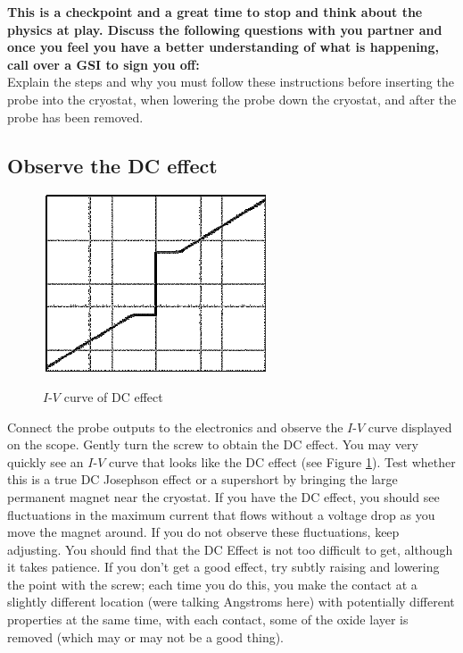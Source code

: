 \documentclass{../lab}
\begin{document}
\textbf{This is a checkpoint and a great time to stop and think about the physics at play. Discuss the following questions with you partner and once you feel you have a better understanding of what is happening, call over a GSI to sign you off:}\\
Explain the steps and why you must follow these instructions before inserting the probe into the cryostat, when lowering the probe down the cryostat, and after the probe has been removed.

\subsection{Observe the DC effect}

\begin{figure}[h]
    \centering
    \href{http://experimentationlab.berkeley.edu/sites/default/files/images/250px-JOS15.gif}{\includegraphics[width=0.5\linewidth]{images/250px-JOS15.png}}
    \caption{$I$-$V$ curve of DC effect}
    \label{fig:IVCurveOfDCEffect}
\end{figure}

Connect the probe outputs to the electronics and observe the $I$-$V$ curve displayed on the scope. Gently turn the screw to obtain the DC effect. You may very quickly see an $I$-$V$ curve that looks like the DC effect (see Figure \ref{fig:IVCurveOfDCEffect}). Test whether this is a true DC Josephson effect or a supershort by bringing the large permanent magnet near the cryostat. If you have the DC effect, you should see fluctuations in the maximum current that flows without a voltage drop as you move the magnet around. If you do not observe these fluctuations, keep adjusting. You should find that the DC Effect is not too difficult to get, although it takes patience. If you don't get a good effect, try subtly raising and lowering the point with the screw; each time you do this, you make the contact at a slightly different location (were talking Angstroms here) with potentially different properties at the same time, with each contact, some of the oxide layer is removed (which may or may not be a good thing).
\end{document}

